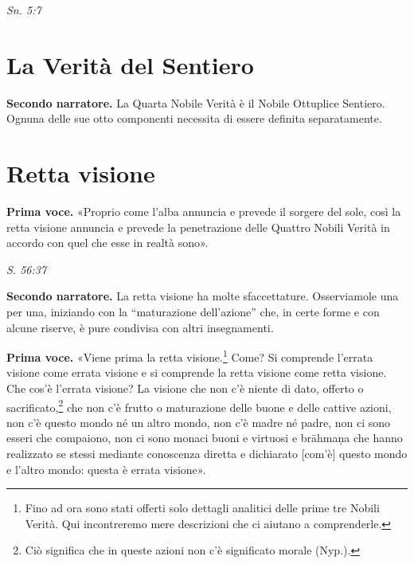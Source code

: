 \emph{Sn. 5:7}


\hypertarget{x-la-verità-del-sentiero}{\section*{La Verità del Sentiero}}
\textbf{Secondo narratore.} La Quarta Nobile Verità è il Nobile Ottuplice
Sentiero. Ognuna delle sue otto componenti necessita di essere definita
separatamente.


\hypertarget{x-retta-visione}{\section*{Retta visione}}
\textbf{Prima voce.} «Proprio come l’alba annuncia e prevede il sorgere del sole,
così la retta visione annuncia e prevede la penetrazione delle Quattro
Nobili Verità in accordo con quel che esse in realtà sono».


\emph{S. 56:37}


\textbf{Secondo narratore.} La retta visione ha molte sfaccettature. Osserviamole
una per una, iniziando con la “maturazione dell’azione” che, in certe
forme e con alcune riserve, è pure condivisa con altri insegnamenti.


\textbf{Prima voce.} «Viene prima la retta visione.\footnote{Fino ad ora sono stati offerti solo dettagli analitici delle prime tre Nobili Verità. Qui incontreremo mere descrizioni che ci aiutano a comprenderle.} Come? Si
comprende l’errata visione come errata visione e si comprende la retta
visione come retta visione. Che cos’è l’errata visione? La visione che
non c’è niente di dato, offerto o sacrificato,\footnote{Ciò significa che in queste azioni non c’è significato morale (Nyp.).} che
non c’è frutto o maturazione delle buone e delle cattive azioni, non c’è
questo mondo né un altro mondo, non c’è madre né padre, non ci sono
esseri che compaiono, non ci sono monaci buoni e virtuosi e brāhmaṇa che
hanno realizzato se stessi mediante conoscenza diretta e dichiarato
[com’è] questo mondo e l’altro mondo: questa è errata visione».



